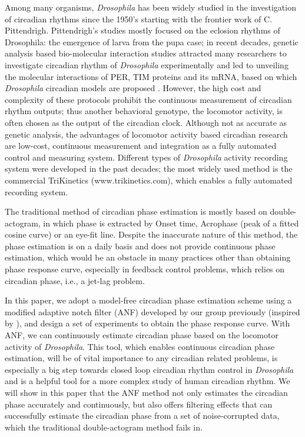 \documentclass[11pt, onecolumn]{IEEEtran}
\begin{document}
Among many organisms, \emph{Drosophila} has been widely studied in the investigation of circadian rhythms since the 1950's starting with the frontier work of C. Pittendrigh. Pittendrigh's studies mostly focused on the eclosion rhythms of Drosophila: the emergence of larva from the pupa case; in recent decades, genetic analysis based bio-molecular interaction studies attracted many researchers to investigate circadian rhythm of \emph{Drosophila} experimentally and led to unveiling the molecular interactions of PER, TIM proteins and its mRNA, based on which \emph{Drosophila} circadian models are proposed \cite{Leloup99}. However, the high cost and complexity of these protocols prohibit the continuous measurement of circadian rhythm outputs; thus another behavioral genotype, the locomotor activity, is often chosen as the output of the circadian clock. Although not as accurate as genetic analysis, the advantages of locomotor activity based circadian research are low-cost, continuous measurement and integration as a fully automated control and measuring system. Different types of \emph{Drosophila} activity recording system were developed in the past decades; the most widely used method is the commercial TriKinetics (www.trikinetics.com), which enables a fully automated recording system.

The traditional method of circadian phase estimation is mostly based on double-actogram, in which phase is extracted by Onset time, Acrophase (peak of a fitted cosine curve) or an eye-fit line. Despite the inaccurate nature of this method, the phase estimation is on a daily basis and does not provide continuous phase estimation, which would be an obstacle in many practices other than obtaining phase response curve, especially in feedback control problems, which relies on circadian phase, i.e., a jet-lag problem.

In this paper, we adopt a model-free circadian phase estimation scheme using a modified adaptive notch filter (ANF) developed by our group previously \cite{ZhangACC13} (inspired by \cite{Hsu1999}), and design a set of experiments to obtain the phase response curve. With ANF, we can continuously estimate circadian phase based on the locomotor activity of \emph{Drosophila}. This tool, which enables continuous circadian phase estimation, will be of vital importance to any circadian related problems, is especially a big step towards closed loop circadian rhythm control in \emph{Drosophila} and is a helpful tool for a more complex study of human circadian rhythm. We will show in this paper that the ANF method not only estimates the circadian phase accurately and continuously, but also offers filtering effects that can successfully estimate the circadian phase from a set of noise-corrupted data, which the traditional double-actogram method fails in.
\end{document}
